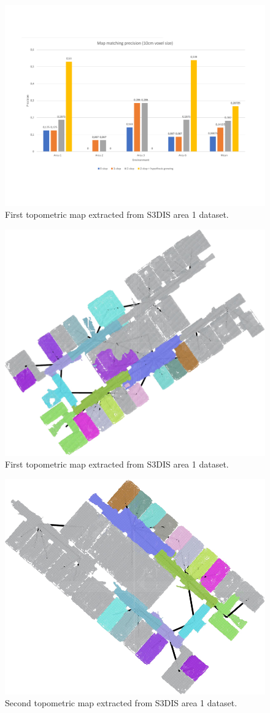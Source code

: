 \begin{figure}[h]
    \centering
    \includegraphics*[width=\textwidth]{./fig/map_match_precision_10cm.pdf}
    \caption{First topometric map extracted from S3DIS area 1 dataset.}
    \label{fig:map_match_precision}
\end{figure}

\begin{figure}[h]
    \centering
    \includegraphics*[width=.6\textwidth]{./fig/area_1_match_01.png}
    \caption{First topometric map extracted from S3DIS area 1 dataset.}
    \label{fig:area_1_match_01}
\end{figure}

\begin{figure}[h]
    \centering
    \includegraphics*[width=.6\textwidth]{./fig/area_1_match_02.png}
    \caption{Second topometric map extracted from S3DIS area 1 dataset.}
    \label{fig:area_1_match_02}
\end{figure}

